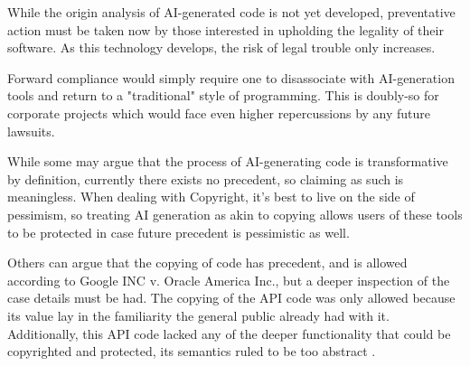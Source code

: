 \documentclass[journal]{IEEEtran}
\begin{document}




While the origin analysis of AI-generated code is not yet developed, preventative
action must be taken now by those interested in upholding the legality of their
software. As this technology develops, the risk of legal trouble only increases.

Forward compliance would simply require one to disassociate with AI-generation tools and
return to a "traditional" style of programming. This is doubly-so for corporate
projects which would face even higher repercussions by any future lawsuits.

While some may argue that the process of AI-generating code is transformative by
definition, currently there exists no precedent, so claiming as such is meaningless.
When dealing with Copyright, it's best to live on the side of pessimism, so
treating AI generation as akin to copying allows users of these tools
to be protected in case future precedent is pessimistic as well. 

Others can argue that the copying of code has precedent, and is allowed according
to Google INC v. Oracle America Inc., but a deeper inspection of the case details must
be had. The copying of the API code was only allowed because its value lay
in the familiarity the general public already had with it. Additionally, this API code
lacked any of the deeper functionality that could be copyrighted and protected, its semantics
ruled to be too abstract \cite{harvard}.
\end{document}
